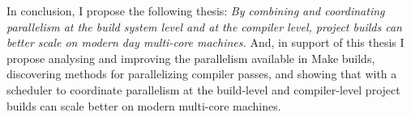 \documentclass[10pt]{article}
\begin{document}
In conclusion, I propose the following thesis: \emph{By combining and coordinating parallelism at the build system level
and at the compiler level, project builds can better scale on modern day multi-core
machines.}  And, in support of this thesis I propose analysing and improving the parallelism available in Make builds,
discovering methods for parallelizing compiler passes, and showing that with a scheduler to coordinate parallelism at
the build-level and compiler-level project builds can scale better on modern multi-core machines.

\newpage


\end{document}
